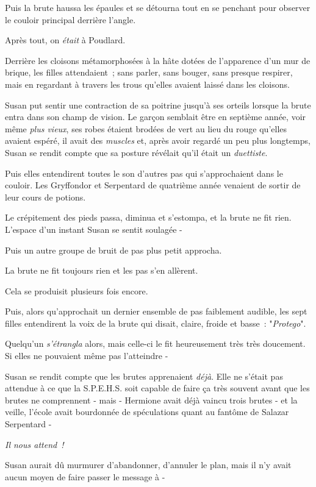 Puis la brute haussa les épaules et se détourna tout en se penchant pour observer le couloir principal derrière l'angle.

Après tout, on \emph{était} à Poudlard.

Derrière les cloisons métamorphosées à la hâte dotées de l'apparence d'un mur de brique, les filles attendaient~; sans parler, sans bouger, sans presque respirer, mais en regardant à travers les trous qu'elles avaient laissé dans les cloisons.

Susan put sentir une contraction de sa poitrine jusqu'à ses orteils lorsque la brute entra dans son champ de vision. Le garçon semblait être en septième année, voir même \emph{plus vieux}, ses robes étaient brodées de vert au lieu du rouge qu'elles avaient espéré, il avait des \emph{muscles} et, après avoir regardé un peu plus longtemps, Susan se rendit compte que sa posture révélait qu'il était un \emph{duettiste}.

Puis elles entendirent toutes le son d'autres pas qui s'approchaient dans le couloir. Les Gryffondor et Serpentard de quatrième année venaient de sortir de leur cours de potions.

Le crépitement des pieds passa, diminua et s'estompa, et la brute ne fit rien. L'espace d'un instant Susan se sentit soulagée -

Puis un autre groupe de bruit de pas plus petit approcha.

La brute ne fit toujours rien et les pas s'en allèrent.

Cela se produisit plusieurs fois encore.

Puis, alors qu'approchait un dernier ensemble de pas faiblement audible, les sept filles entendirent la voix de la brute qui disait, claire, froide et basse~: "\emph{Protego}".

Quelqu'un \emph{s'étrangla} alors, mais celle-ci le fit heureusement très très doucement. Si elles ne pouvaient même pas l'atteindre -

Susan se rendit compte que les brutes apprenaient \emph{déjà}. Elle ne s'était pas attendue à ce que la S.P.E.H.S. soit capable de faire ça très souvent avant que les brutes ne comprennent - mais - Hermione avait déjà vaincu trois brutes - et la veille, l'école avait bourdonnée de spéculations quant au fantôme de Salazar Serpentard -

\emph{Il nous attend~!}

Susan aurait dû murmurer d'abandonner, d'annuler le plan, mais il n'y avait aucun moyen de faire passer le message à -

